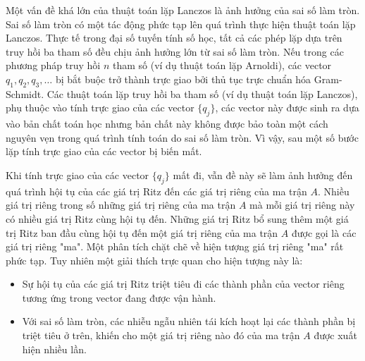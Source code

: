 \documentclass[14pt, a4paper]{article}
\numberwithin{equation}{section}
\numberwithin{algorithm}{section}
\numberwithin{figure}{section}
\numberwithin{dl}{section}
\numberwithin{md}{section}
\numberwithin{bd}{section}
\numberwithin{dn}{section}
\numberwithin{hq}{section}
\begin{document}
Một vấn đề khá lớn của thuật toán lặp Lanczos là ảnh hưởng của sai số làm tròn.
Sai số làm tròn có một tác động phức tạp lên quá trình thực hiện thuật toán lặp Lanczos. Thực tế trong đại số tuyến tính số học, tất cả các phép lặp dựa trên truy hồi ba tham số đều chịu ảnh hưởng lớn từ sai số làm tròn.
Nếu trong các phương pháp truy hồi $n$ tham số (ví dụ thuật toán lặp Arnoldi), các vector $q_1, q_2, q_3, \dots$ bị bắt buộc trở thành trực giao bởi thủ tục trực chuẩn hóa Gram-Schmidt. Các thuật toán lặp truy hồi ba tham số (ví dụ thuật toán lặp Lanczos), phụ thuộc vào tính trực giao của các vector $\lbrace q_j \rbrace$, các vector này được sinh ra dựa vào bản chất toán học nhưng bản chất này không được bảo toàn một cách nguyên vẹn trong quá trình tính toán do sai số làm tròn. Vì vậy, sau một số bước lặp tính trực giao của các vector bị biến mất.

Khi tính trực giao của các vector $\lbrace q_j \rbrace$ mất đi, vẫn đề này sẽ làm ảnh hưởng đến quá trình hội tụ của các giá trị Ritz đến các giá trị riêng của ma trận $A$. Nhiều giá trị riêng trong số những giá trị riêng của ma trận $A$ mà mỗi giá trị riêng này có nhiều giá trị Ritz cùng hội tụ đến. Những giá trị Ritz bổ sung thêm một giá trị Ritz ban đầu cùng hội tụ đến một giá trị riêng của ma trận $A$ được gọi là các giá trị riêng "ma".
Một phân tích chặt chẽ về hiện tượng giá trị riêng "ma" rất phức tạp. Tuy nhiên một giải thích trực quan cho hiện tượng này là:

\begin{itemize}
    \item Sự hội tụ của các giá trị Ritz triệt tiêu đi các thành phần của vector riêng tương ứng trong vector đang được vận hành.
    \item Với sai số làm tròn, các nhiễu ngẫu nhiên tái kích hoạt lại các thành phần bị triệt tiêu ở trên, khiến cho một giá trị riêng nào đó của ma trận $A$ được xuất hiện nhiều lần.
\end{itemize}
\end{document}
